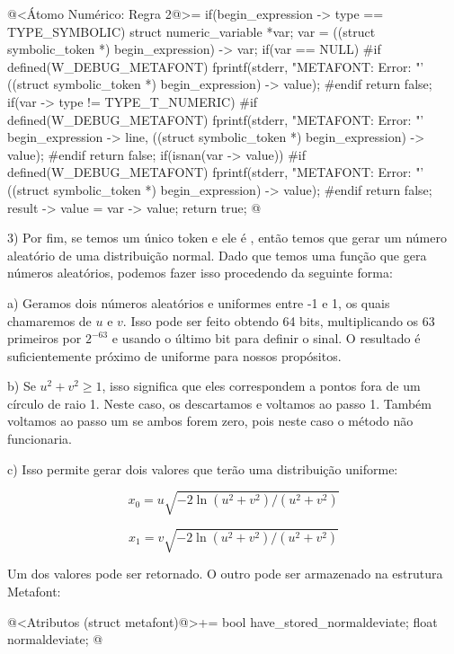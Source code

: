 \iniciocodigo
@<Átomo Numérico: Regra 2@>=
if(begin_expression -> type == TYPE_SYMBOLIC){
  struct numeric_variable *var;
  var = ((struct symbolic_token *) begin_expression) -> var;
  if(var == NULL){
#if defined(W_DEBUG_METAFONT)
    fprintf(stderr, "METAFONT: Error: %
            "'%
            ((struct symbolic_token *) begin_expression) -> value);
#endif
    return false;
  }
  if(var -> type != TYPE_T_NUMERIC){
#if defined(W_DEBUG_METAFONT)
    fprintf(stderr, "METAFONT: Error: %
            "'%
            begin_expression -> line,
            ((struct symbolic_token *) begin_expression) -> value);
#endif
    return false;
  }
  if(isnan(var -> value)){
#if defined(W_DEBUG_METAFONT)
    fprintf(stderr, "METAFONT: Error: %
            "'%
            ((struct symbolic_token *) begin_expression) -> value);
#endif
    return false;
  }
  result -> value = var -> value;
  return true;
}
@
\fimcodigo

3) Por fim, se temos um único token e ele é ,
então temos que gerar um número aleatório de uma distribuição
normal. Dado que temos uma função que gera números aleatórios, podemos
fazer isso procedendo da seguinte forma:

a) Geramos dois números aleatórios e uniformes entre -1 e 1, os quais
chamaremos de $u$ e $v$. Isso pode ser feito obtendo 64 bits,
multiplicando os 63 primeiros por $2^{-63}$ e usando o último bit para
definir o sinal. O resultado é suficientemente próximo de uniforme
para nossos propósitos.

b) Se $u^2+v^2 \geq 1$, isso significa que eles correspondem a pontos
fora de um círculo de raio 1. Neste caso, os descartamos e voltamos ao
passo 1. Também voltamos ao passo um se ambos forem zero, pois neste
caso o método não funcionaria.

c) Isso permite gerar dois valores que terão uma distribuição
uniforme:

$$
x_0 = u\sqrt{-2\ln(u^2+v^2)/(u^2+v^2)}
$$

$$
x_1 = v\sqrt{-2\ln(u^2+v^2)/(u^2+v^2)}
$$

Um dos valores pode ser retornado. O outro pode ser armazenado na
estrutura Metafont:

\iniciocodigo
@<Atributos (struct metafont)@>+=
  bool have_stored_normaldeviate;
  float normaldeviate;
@
\fimcodigo

